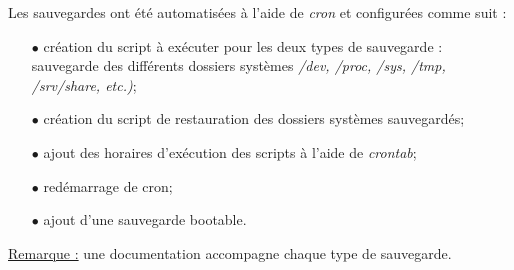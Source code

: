 Les sauvegardes ont été automatisées à l'aide de \textit{cron} et configurées
comme suit :
\begin{itemize}

    \item[$\bullet$] création du script à exécuter pour les deux types de
    sauvegarde : sauvegarde des différents dossiers systèmes
    \textit{/dev, /proc, /sys, /tmp, /srv/share, etc.)};
    \item[$\bullet$] création du script de restauration des dossiers systèmes
    sauvegardés;
    \item[$\bullet$] ajout des horaires d'exécution des scripts à l'aide de
    \textit{crontab};
    \item[$\bullet$] redémarrage de cron;
    \item[$\bullet$] ajout d'une sauvegarde bootable. \\

\end{itemize}

\underline{Remarque :} une documentation accompagne chaque type de sauvegarde.


